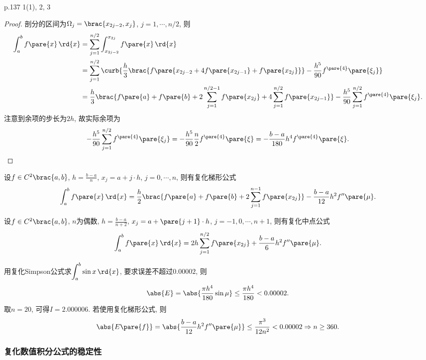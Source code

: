 \documentclass[hidelinks]{ctexart}
\begin{document}
p.137 1(1), 2, 3


\begin{proof}
    剖分的区间为$\Omega_j = \brac{x_{2j-2},x_j}$, $j = 1,\cdots,n/2$, 则
    \begin{align*}
        \int_a^b f\pare{x}\,\rd{x} &= \sum_{j=1}^{n/2} \int_{x_{2j-2}}^{x_{2j}} f\pare{x}\,\rd{x} \\
        &= \sum_{j=1}^{n/2} \curb{ \frac{h}{3} \brac{f\pare{x_{2j-2} + 4f\pare{x_{2j-1}} + f\pare{x_{2j}}}} - \frac{h^5}{90}f^{\pare{4}}\pare{\xi_j} } \\
        &= \frac{h}{3}\brac{f\pare{a} + f\pare{b} + 2\sum_{j=1}^{n/2-1} f\pare{x_{2j}} + 4\sum_{j=1}^{n/2}f\pare{x_{2j-1}}} - \frac{h^5}{90}\sum_{j=1}^{n/2}f^{\pare{4}}\pare{\xi_j}.
    \end{align*}
    注意到余项的步长为$2h$, 故实际余项为
    \[ - \frac{h^5}{90}\sum_{j=1}^{n/2}f^{\pare{4}}\pare{\xi_j} = - \frac{h^5}{90}\frac{n}{2} f^{\pare{4}}\pare{\xi} = -\frac{b-a}{180}h^4 f^{\pare{4}}\pare{\xi}. \qedhere \]
\end{proof}

\begin{theorem}
    设$f\in C^2\brac{a,b}$, $\displaystyle h = \frac{b-a}{n}$, $x_j = a+j\cdot h$, $j = 0,\cdots, n$, 则有复化梯形公式
    \[ \int_a^b f\pare{x}\,\rd{x} = \frac{h}{2}\brac{f\pare{a}+f\pare{b}+2\sum_{j=1}^{n-1}f\pare{x_{2j}}} - \frac{b-a}{12}h^2f''\pare{\mu}. \]
\end{theorem}
\begin{theorem}
    设$f\in C^2\brac{a,b}$, $n$为偶数, $\displaystyle h = \frac{b-a}{n+2}$, $x_j = a+\pare{j+1}\cdot h$, $j = -1,0,\cdots,n+1$, 则有复化中点公式
    \[ \int_a^b f\pare{x}\,\rd{x} = 2h\sum_{j=1}^{n/2}f\pare{x_{2j}} + \frac{b-a}{6}h^2 f''\pare{\mu}. \]
\end{theorem}
\begin{ex}
    用复化Simpson公式求$\displaystyle \int_a^b \sin x\,\rd{x}$, 要求误差不超过$0.00002$, 则
    \[ \abs{E} = \abs{\frac{\pi h^4}{180}\sin\mu} \le \frac{\pi h^4}{180} < 0.00002. \]
    取$n=20$, 可得$I = 2.000006$. 若使用复化梯形公式, 则
    \[ \abs{E\pare{f}} = \abs{\frac{b-a}{12}h^2 f''\pare{\mu}} \le \frac{\pi^3}{12n^2} < 0.00002 \Rightarrow n\ge 360. \]
\end{ex}


\subsubsection{复化数值积分公式的稳定性} %
\label{ssub:复化数值积分公式的稳定性}
\end{document}
